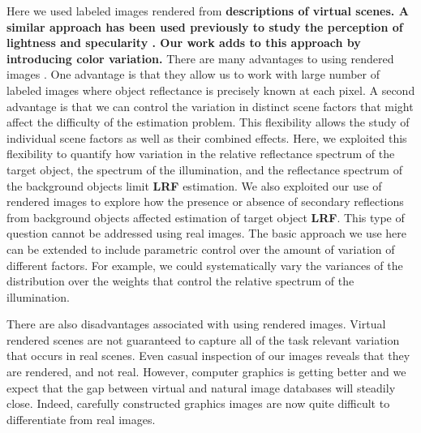 \documentclass{jov}
\providecommand{\DIFaddtex}[1]{{\bf #1}} %
\providecommand{\DIFdeltex}[1]{} %
\providecommand{\DIFaddbegin}{} %
\providecommand{\DIFaddend}{} %
\providecommand{\DIFdelbegin}{} %
\providecommand{\DIFdelend}{} %
\providecommand{\DIFadd}[1]{\texorpdfstring{\DIFaddtex{#1}}{#1}} %
\providecommand{\DIFdel}[1]{\texorpdfstring{\DIFdeltex{#1}}{}} %
\newcommand{\DIFscaledelfig}{0.5}
\newlength{\DIFdelgraphicswidth} %
\newlength{\DIFdelgraphicsheight} %
\newcommand{\DIFaddincludegraphics}[2][]{{\color{blue}\fbox{\DIFOincludegraphics[#1]{#2}}}} %
\newcommand{\DIFdelincludegraphics}[2][]{%
\sbox{\DIFdelgraphicsbox}{\DIFOincludegraphics[#1]{#2}}%
\settoboxwidth{\DIFdelgraphicswidth}{\DIFdelgraphicsbox} %
\settoboxtotalheight{\DIFdelgraphicsheight}{\DIFdelgraphicsbox} %
\scalebox{\DIFscaledelfig}{%
\parbox[b]{\DIFdelgraphicswidth}{\usebox{\DIFdelgraphicsbox}\\[-\baselineskip] \rule{\DIFdelgraphicswidth}{0em}}\llap{\resizebox{\DIFdelgraphicswidth}{\DIFdelgraphicsheight}{%
\setlength{\unitlength}{\DIFdelgraphicswidth}%
\begin{picture}(1,1)%
\thicklines\linethickness{2pt} %
{\color[rgb]{1,0,0}\put(0,0){\framebox(1,1){}}}%
{\color[rgb]{1,0,0}\put(0,0){\line( 1,1){1}}}%
{\color[rgb]{1,0,0}\put(0,1){\line(1,-1){1}}}%
\end{picture}%
}\hspace*{3pt}}} %
} %
\DeclareRobustCommand{\DIFaddbegin}{\DIFOaddbegin \let\includegraphics\DIFaddincludegraphics} %
\DeclareRobustCommand{\DIFaddend}{\DIFOaddend \let\includegraphics\DIFOincludegraphics} %
\DeclareRobustCommand{\DIFdelbegin}{\DIFOdelbegin \let\includegraphics\DIFdelincludegraphics} %
\DeclareRobustCommand{\DIFdelend}{\DIFOaddend \let\includegraphics\DIFOincludegraphics} %
\begin{document}
Here we used labeled images rendered from \DIFdelbegin \DIFdel{virtual scene descriptions . 
}\DIFdelend \DIFaddbegin \DIFadd{descriptions of virtual scenes. 
A similar approach has been used previously to study the perception of lightness and specularity \cite{toscani2013optimal,wiebel2015statistical,toscani2017lightness}. 
Our work adds to this approach by introducing color variation. 
}\DIFaddend There are many advantages to using rendered images \cite{Butler:ECCV:2012}. 
One advantage is that they allow us to work with large number of labeled images where object reflectance is precisely known at each pixel. A second advantage is that we can control the variation in distinct scene factors that might affect the difficulty of the estimation problem. This flexibility allows the study of individual scene factors as well as their combined effects. Here, we exploited this flexibility to quantify how variation in the relative reflectance spectrum of the target object, the spectrum of the illumination, and the reflectance spectrum of the background objects limit \DIFdelbegin \DIFdel{LRV }\DIFdelend \DIFaddbegin \DIFadd{LRF }\DIFaddend estimation. We also exploited our use of rendered images to explore how the presence or absence of secondary reflections from background objects affected estimation of target object \DIFdelbegin \DIFdel{LRV}\DIFdelend \DIFaddbegin \DIFadd{LRF}\DIFaddend . This type of question cannot be addressed using real images. The basic approach we use here can be extended to include parametric control over the amount of variation of different factors. For example, we could systematically vary the variances of the distribution over the weights that control the relative spectrum of the illumination.

There are also disadvantages associated with using rendered images. 
Virtual rendered scenes are not guaranteed to capture all of the task relevant variation that occurs in real scenes.
Even casual inspection of our images reveals that they are rendered, and not real.
However, computer graphics is getting better and we expect that the gap between virtual and natural image databases will steadily close.
Indeed, carefully constructed graphics images are now quite difficult to differentiate from real images.
\end{document}
